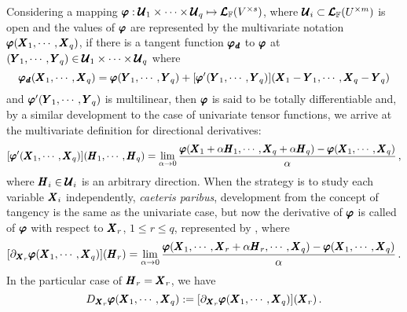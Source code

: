 Considering a mapping $\pmb{\varphi} : \pmb{\mathcal{U}}_1\times\cdots\times\pmb{\mathcal{U}}_q \mapsto \pmb{\mathcal{L}}_{\mathbb{F}}(V^{\times s})$, where $\pmb{\mathcal{U}}_i\subset\pmb{\mathcal{L}}_{\mathbb{F}}(U^{\times m})$ is open and the values of $\pmb{\varphi}$ are represented by the multivariate notation $\pmb{\varphi}(\pmb{X}_1,\cdots,\pmb{X}_q)$, if there is a tangent function $\pmb{\varphi_\mathit{d}}$ to $\pmb{\varphi}$ at $(\pmb{Y}_1,\cdots,\pmb{Y}_q)\in\pmb{\mathcal{U}}_1\times\cdots\times\pmb{\mathcal{U}}_q$ where
\begin{equation*}
\pmb{\varphi_\mathit{d}}(\pmb{X}_1,\cdots,\pmb{X}_q)=\pmb{\varphi}(\pmb{Y}_1,\cdots,\pmb{Y}_q)+[\pmb{\varphi}'(\pmb{Y}_1,\cdots,\pmb{Y}_q)](\pmb{X}_1-\pmb{Y}_1,\cdots,\pmb{X}_q-\pmb{Y}_q)
\end{equation*}
and $\pmb{\varphi}'(\pmb{Y}_1,\cdots,\pmb{Y}_q)$ is multilinear, then $\pmb{\varphi}$ is said to be totally differentiable and, by a similar development to the case of univariate tensor functions, we arrive at the multivariate definition for directional derivatives:
\begin{equation}\label{eq:totalDerivative}
[\pmb{\varphi}'(\pmb{X}_1,\cdots,\pmb{X}_q)](\pmb{H}_1,\cdots,\pmb{H}_q)=\lim_{\alpha\to 0} \dfrac{\pmb{\varphi}(\pmb{X}_1+\alpha\pmb{H}_1,\cdots,\pmb{X}_q+\alpha\pmb{H}_q)-\pmb{\varphi}(\pmb{X}_1,\cdots,\pmb{X}_q)}{\alpha}\,,
\end{equation}
where $\pmb{H}_i\in\pmb{\mathcal{U}}_i$ is an arbitrary direction. When the strategy is to study each variable $\pmb{X}_i$ independently, \emph{caeteris paribus}, development from the concept of tangency is the same as the univariate case, but now the derivative of $\pmb{\varphi}$  is called  of $\pmb{\varphi}$ with respect to $\pmb{X}_r$, $1\leqslant r\leqslant q$, represented by , where
\begin{equation}\label{eq:partialDerivative}
[\partial_{\pmb{X}_r}\pmb{\varphi}(\pmb{X}_1,\cdots,\pmb{X}_q)]{(\pmb{H}_r)}=\lim_{\alpha\to 0} \dfrac{\pmb{\varphi}(\pmb{X}_1,\cdots,\pmb{X}_r+\alpha\pmb{H}_r,\cdots,\pmb{X}_q)-\pmb{\varphi}(\pmb{X}_1,\cdots,\pmb{X}_q)}{\alpha}\,.
\end{equation}
In the particular case of $\pmb{H}_r=\pmb{X}_r$, we have 
\begin{equation}\label{eq:derivDPartial}
D_{\pmb{X}_r}\pmb{\varphi}(\pmb{X}_1,\cdots,\pmb{X}_q):=[\partial_{\pmb{X}_r}\pmb{\varphi}(\pmb{X}_1,\cdots,\pmb{X}_q)]{(\pmb{X}_r)}\,.
\end{equation}
